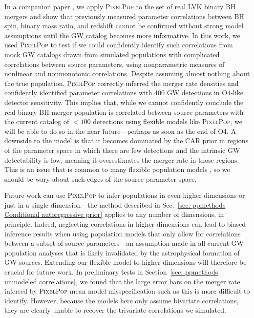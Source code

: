 \begin{refsection}
In a companion paper \cite{Heinzel:2024hva}, we apply \textsc{PixelPop} to the set of real LVK binary BH mergers and show that previously measured parameter correlations between BH spin, binary mass ratio, and redshift \cite{Callister:2021fpo, Biscoveanu:2022qac} cannot be confirmed without strong model assumptions until the GW catalog becomes more informative. In this work, we used \textsc{PixelPop} to test if we could confidently identify such correlations from mock GW catalogs drawn from simulated populations with complicated correlations between source parameters, using nonparametric measures of nonlinear and nonmonotonic correlations. Despite assuming almost nothing about the true population, \textsc{PixelPop} correctly inferred the merger rate densities and confidently identified parameter correlations with 400 GW detections in O4-like detector sensitivity. This implies that, while we cannot confidently conclude the real binary BH merger population is correlated between source parameters with the current catalog of $<100$ detections using flexible models like \textsc{PixelPop}, we will be able to do so in the near future---perhaps as soon as the end of O4. A downside to the model is that it becomes dominated by the CAR prior in regions of the parameter space in which there are few detections and the intrinsic GW detectability is low, meaning it overestimates the merger rate in those regions. This is an issue that is common to many flexible population models \cite{Golomb:2022bon, Edelman:2022ydv, Callister:2023tgi}, so we should be wary about such edges of the source parameter space.

Future work can use \textsc{PixelPop} to infer populations in even higher dimensions or just in a single dimension---the method described in Sec.~\ref{sec: ppmethods Conditional autoregressive prior} applies to any number of dimensions, in principle.
Indeed, neglecting correlations in higher dimensions can lead to biased inference results when using population models that only allow for correlations between a subset of source parameters---an assumption made in all current GW population analyses that is likely invalidated by the astrophysical formation of GW sources. Extending our flexible model to higher dimensions will therefore be crucial for future work. In preliminary tests in Section~\ref{sec: ppmethods unmodeled correlations}, we found that the large error bars on the merger rate inferred by \textsc{PixelPop} mean model misspecification such as this is more difficult to identify. 
However, because the models here only assume bivariate correlations, they are clearly unable to recover the trivariate correlations we simulated.


\end{refsection}
